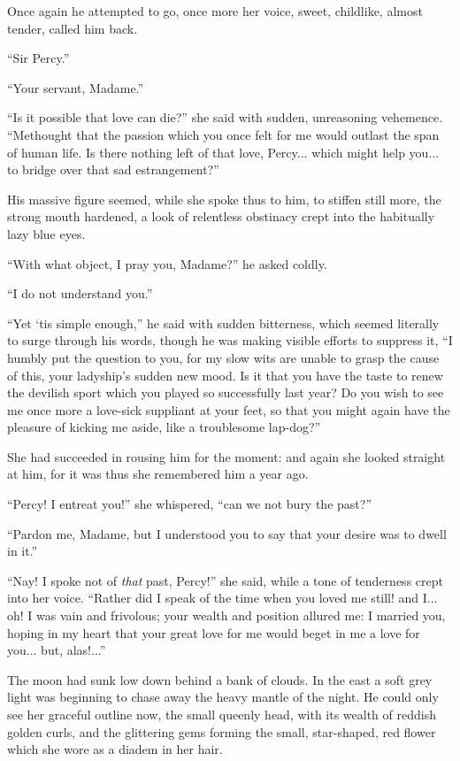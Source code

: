 \documentclass[paper=5.5in:8.5in,BCOR=7mm,twoside,DIV=calc,12pt,usegeometry,chapterprefix,endperiod,headings=big]{scrbook}
\begin{document}
Once again he attempted to go, once more her voice, sweet, childlike, almost tender, called him back.

\enquote{Sir Percy.}

\enquote{Your servant, Madame.}

\enquote{Is it possible that love can die?} she said with sudden, unreasoning vehemence. \enquote{Methought that the passion which you once felt for me would outlast the span of human life. Is there nothing left of that love, Percy... which might help you... to bridge over that sad estrangement?}

His massive figure seemed, while she spoke thus to him, to stiffen still more, the strong mouth hardened, a look of relentless obstinacy crept into the habitually lazy blue eyes.

\enquote{With what object, I pray you, Madame?} he asked coldly.

\enquote{I do not understand you.}

\enquote{Yet `tis simple enough,} he said with sudden bitterness, which seemed literally to surge through his words, though he was making visible efforts to suppress it, \enquote{I humbly put the question to you, for my slow wits are unable to grasp the cause of this, your ladyship's sudden new mood. Is it that you have the taste to renew the devilish sport which you played so successfully last year? Do you wish to see me once more a love-sick suppliant at your feet, so that you might again have the pleasure of kicking me aside, like a troublesome lap-dog?}

She had succeeded in rousing him for the moment: and again she looked straight at him, for it was thus she remembered him a year ago.

\enquote{Percy! I entreat you!} she whispered, \enquote{can we not bury the past?}

\enquote{Pardon me, Madame, but I understood you to say that your desire was to dwell in it.}

\enquote{Nay! I spoke not of \textit{that} past, Percy!} she said, while a tone of tenderness crept into her voice. \enquote{Rather did I speak of the time when you loved me still! and I... oh! I was vain and frivolous; your wealth and position allured me: I married you, hoping in my heart that your great love for me would beget in me a love for you... but, alas!...}

The moon had sunk low down behind a bank of clouds. In the east a soft grey light was beginning to chase away the heavy mantle of the night. He could only see her graceful outline now, the small queenly head, with its wealth of reddish golden curls, and the glittering gems forming the small, star-shaped, red flower which she wore as a diadem in her hair.
\end{document}
